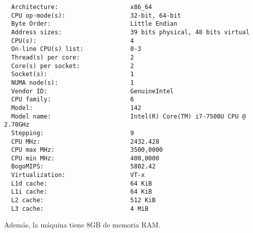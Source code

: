\documentclass[11pt]{article}
\begin{document}
\begin{lstlisting}
  Architecture:                    x86_64
  CPU op-mode(s):                  32-bit, 64-bit
  Byte Order:                      Little Endian
  Address sizes:                   39 bits physical, 48 bits virtual
  CPU(s):                          4
  On-line CPU(s) list:             0-3
  Thread(s) per core:              2
  Core(s) per socket:              2
  Socket(s):                       1
  NUMA node(s):                    1
  Vendor ID:                       GenuineIntel
  CPU family:                      6
  Model:                           142
  Model name:                      Intel(R) Core(TM) i7-7500U CPU @ 2.70GHz
  Stepping:                        9
  CPU MHz:                         2432.428
  CPU max MHz:                     3500,0000
  CPU min MHz:                     400,0000
  BogoMIPS:                        5802.42
  Virtualization:                  VT-x
  L1d cache:                       64 KiB
  L1i cache:                       64 KiB
  L2 cache:                        512 KiB
  L3 cache:                        4 MiB
  \end{lstlisting}

Además, la máquina tiene 8GB de memoria RAM.

\pagebreak


\end{document}
